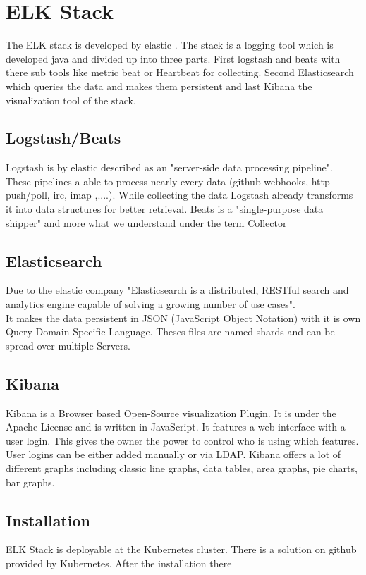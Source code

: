\section{ELK Stack }
\label{elk} %
The ELK stack is developed by elastic \cite{elasticsearch}. 
The stack is a logging tool which is developed java and divided up into three parts. First  logstash and beats with there sub tools like metric beat or Heartbeat for collecting. Second Elasticsearch which queries the data and makes them persistent and last Kibana the visualization tool of the stack.
\subsection{Logstash/Beats}
Logstash is by elastic described as an 
"server-side data processing pipeline"\cite{elasticsearch}. These pipelines a able to process nearly every data (github webhooks, http push/poll, irc, imap ,....).
While collecting the data Logstash already transforms it into data structures for better retrieval.
Beats is a "single-purpose data shipper"\cite{elasticsearch} and more what we understand under the term Collector
\subsection{Elasticsearch}
\label{Elasticsearch}
Due to the elastic company "Elasticsearch is a distributed, RESTful search and analytics engine capable of solving a growing number of use cases"\cite{elasticsearch}.\\ It makes the data persistent in JSON (JavaScript Object Notation) with it is own Query Domain Specific Language. Theses files are named shards and can be spread over multiple Servers.
\subsection{Kibana}
Kibana is a Browser based Open-Source visualization Plugin. It is under the Apache License and is written in JavaScript. It features a web interface with a user login. This gives the owner the power to control who is using which features. User logins can be either added manually or via LDAP.
Kibana offers a lot of different graphs including classic line graphs, data tables, area graphs, pie charts, bar graphs.
\subsection{Installation}
ELK Stack is deployable at the Kubernetes cluster. There is a solution on github provided by Kubernetes. After the installation there 

